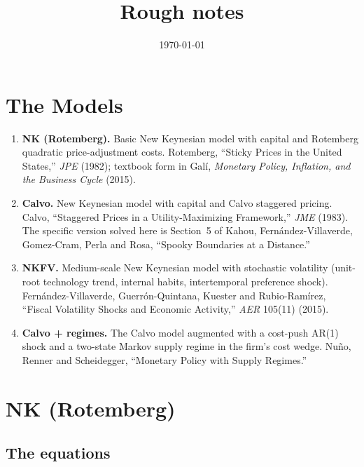 \documentclass[11pt]{article}
\title{Rough notes}
\author{}
\date{\today}
\begin{document}
\maketitle

\section{The Models}

\begin{enumerate}
  \item \textbf{NK (Rotemberg).} Basic New Keynesian model with capital and
  Rotemberg quadratic price-adjustment costs. Rotemberg, ``Sticky Prices in the
  United States,'' \emph{JPE} (1982); textbook form in Gal\'i, \emph{Monetary
  Policy, Inflation, and the Business Cycle} (2015).

  \item \textbf{Calvo.} New Keynesian model with capital and Calvo staggered
  pricing. Calvo, ``Staggered Prices in a Utility-Maximizing Framework,''
  \emph{JME} (1983). The specific version solved here is Section~5 of Kahou,
  Fern\'andez-Villaverde, Gomez-Cram, Perla and Rosa, ``Spooky Boundaries at a
  Distance.''

  \item \textbf{NKFV.} Medium-scale New Keynesian model with stochastic
  volatility (unit-root technology trend, internal habits, intertemporal
  preference shock). Fern\'andez-Villaverde, Guerr\'on-Quintana, Kuester and
  Rubio-Ram\'irez, ``Fiscal Volatility Shocks and Economic Activity,''
  \emph{AER} 105(11) (2015).

  \item \textbf{Calvo + regimes.} The Calvo model augmented with a cost-push
  AR(1) shock and a two-state Markov supply regime in the firm's cost wedge.
  Nu\~no, Renner and Scheidegger, ``Monetary Policy with Supply Regimes.''
\end{enumerate}

\newpage
\section{NK (Rotemberg)}

\subsection{The equations}
\end{document}
